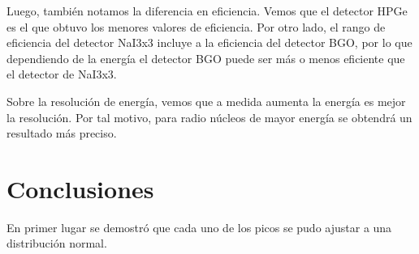 \documentclass[a4paper, onecolumn]{article}
\begin{document}
		Luego, también notamos la diferencia en eficiencia. Vemos que el detector HPGe es el que obtuvo los menores valores de eficiencia. Por otro lado, el rango de eficiencia del detector NaI3x3 incluye a la eficiencia del detector BGO, por lo que dependiendo de la energía el detector BGO puede ser más o menos eficiente que el detector de NaI3x3.

		Sobre la resolución de energía, vemos que a medida aumenta la energía es mejor la resolución. Por tal motivo, para radio núcleos de mayor energía se obtendrá un resultado más preciso.
	\section{Conclusiones}
		En primer lugar se demostró que cada uno de los picos se pudo ajustar a una distribución normal.
	
	
\end{document}
